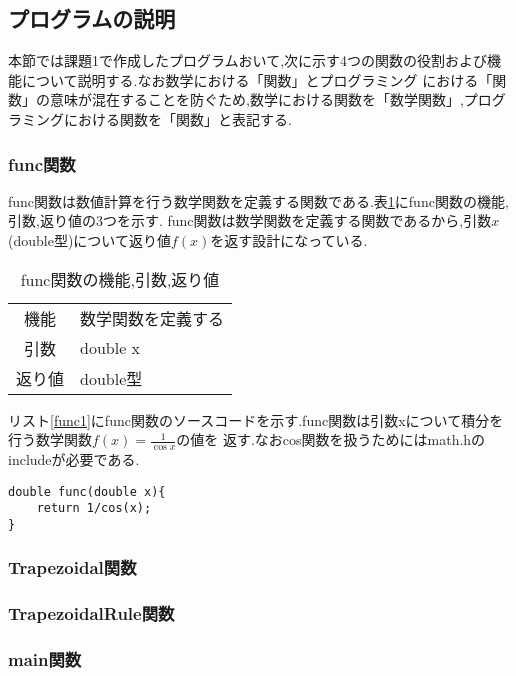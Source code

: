 \documentclass[a4j]{jarticle}
\begin{document}
    \subsection{プログラムの説明}
    本節では課題1で作成したプログラムおいて,次に示す4つの関数の役割および機能について説明する.なお数学における「関数」とプログラミング
    における「関数」の意味が混在することを防ぐため,数学における関数を「数学関数」,プログラミングにおける関数を「関数」と表記する.
    \subsubsection{func関数}
    func関数は数値計算を行う数学関数を定義する関数である.表\ref{func1table}にfunc関数の機能,引数,返り値の3つを示す.
    func関数は数学関数を定義する関数であるから,引数$x$(double型)について返り値$f(x)$を返す設計になっている.
      \begin{table}[H]
      \caption{func関数の機能,引数,返り値}
      \label{func1table}
      \begin{center}
          \begin{tabular}{c|l}\hline
        機能 & 数学関数を定義する\\
        引数 & double x \\
        返り値 & double型 \\ \hline
          \end{tabular}
      \end{center}
      \end{table}

    リスト\ref{func1}にfunc関数のソースコードを示す.func関数は引数xについて積分を行う数学関数$f(x) = \frac{1}{\cos x}$の値を
    返す.なおcos関数を扱うためにはmath.hのincludeが必要である.
    \begin{lstlisting}[basicstyle=\ttfamily\footnotesize, frame=single,label=func1,caption=func関数]
double func(double x){
    return 1/cos(x);
} 
    \end{lstlisting}

    \subsubsection{Trapezoidal関数}
    \subsubsection{TrapezoidalRule関数}
    \subsubsection{main関数}
\end{document}
